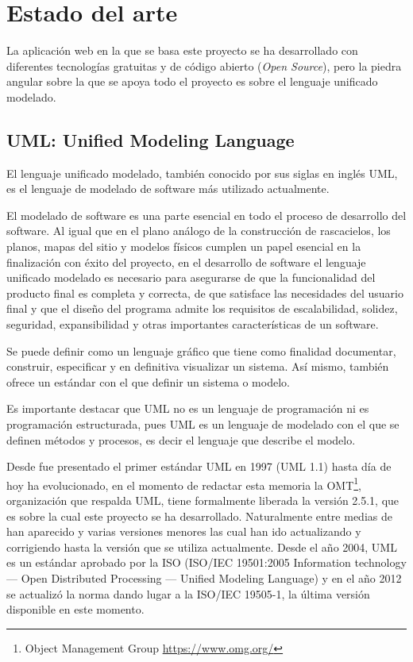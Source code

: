 \documentclass[a4paper, 12pt]{book}
\begin{document}

\cleardoublepage
\chapter{Estado del arte}
\label{chap:estado}
La aplicación web en la que se basa este proyecto se ha desarrollado con diferentes tecnologías gratuitas y de código abierto (\emph{Open Source}), pero la piedra angular sobre la que se apoya todo el proyecto es sobre el lenguaje unificado modelado. 

\section{UML: Unified Modeling Language} 
\label{sec:UML}

El lenguaje unificado modelado, también conocido por sus siglas en inglés UML, es el lenguaje de modelado de software más utilizado actualmente. 

El modelado de software es una parte esencial en todo el proceso de desarrollo del software. Al igual que en el plano análogo de la construcción de rascacielos, los planos, mapas del sitio y modelos físicos cumplen un papel esencial en la finalización con éxito del proyecto, en el desarrollo de software el lenguaje unificado modelado es necesario para asegurarse de que la funcionalidad del producto final es completa y correcta, de que satisface las necesidades del usuario final y que el diseño del programa admite los requisitos de escalabilidad, solidez, seguridad, expansibilidad y otras importantes características de un software. 

Se puede definir como un lenguaje gráfico que tiene como finalidad documentar, construir, especificar y en definitiva visualizar un sistema. Así mismo, también ofrece un estándar con el que definir un sistema o modelo. 

Es importante destacar que UML no es un lenguaje de programación ni es programación estructurada, pues UML es un lenguaje de modelado con el que se definen métodos y procesos, es decir el lenguaje que describe el modelo.

Desde fue presentado el primer estándar UML en 1997 (UML 1.1) hasta día de hoy ha evolucionado, en el momento de redactar esta memoria la OMT\footnote{Object Management Group \url{https://www.omg.org/}}, organización que respalda UML, tiene formalmente liberada la versión 2.5.1, que es sobre la cual este proyecto se ha desarrollado.
Naturalmente entre medias de han aparecido y varias versiones menores las cual han ido actualizando y corrigiendo hasta la versión que se utiliza actualmente. Desde el año 2004, UML es un estándar aprobado por la ISO (ISO/IEC 19501:2005 Information technology — Open Distributed Processing — Unified Modeling Language) y en el año 2012 se actualizó la norma dando lugar a la ISO/IEC 19505-1, la última versión disponible en este momento.
\end{document}
